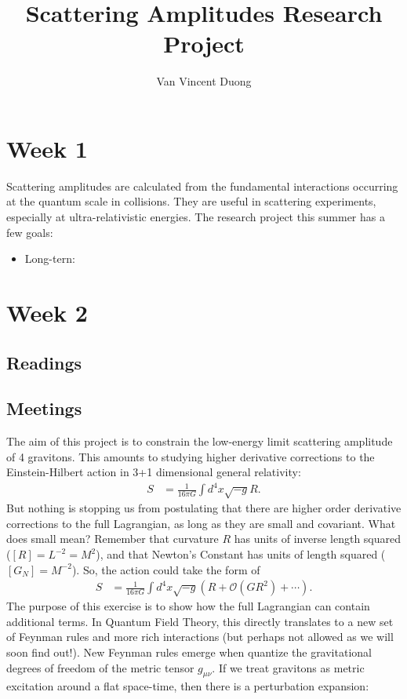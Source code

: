 \documentclass[11pt,a4paper]{article}
\author{Van Vincent Duong}
\title{Scattering Amplitudes Research Project}
\begin{document}
\maketitle

\section*{Week 1}

Scattering amplitudes are calculated from the fundamental interactions occurring at the quantum scale in collisions.  They are useful in scattering experiments, especially at ultra-relativistic energies.  The research project this summer has a few goals:
\begin{itemize}
	\item Long-tern: 
\end{itemize}

\section*{Week 2}
\subsection*{Readings}
\subsection*{Meetings}
The aim of this project is to constrain the low-energy limit scattering amplitude of 4 gravitons.  This amounts to studying higher derivative corrections to the Einstein-Hilbert action in 3+1 dimensional general relativity:
\begin{align*}
S & = \frac{1}{16\pi G}\int d^4x \sqrt{-g}R.
\end{align*}
But nothing is stopping us from postulating that there are higher order derivative corrections to the full Lagrangian, as long as they are small and covariant.  What does small mean?  Remember that curvature $R$ has units of inverse length squared ($[R] = L^{-2} = M^{2}$), and that Newton's Constant has units of length squared ($[G_N] = M^{-2}$).  So, the action could take the form of
\begin{align*}
S & = \frac{1}{16\pi G}\int d^4x \sqrt{-g}(R + \mathcal{O}(G R^2) + \cdots ).
\end{align*}
The purpose of this exercise is to show how the full Lagrangian can contain additional terms.  In Quantum Field Theory, this directly translates to a new set of Feynman rules and more rich interactions (but perhaps not allowed as we will soon find out!).  New Feynman rules emerge when quantize the gravitational degrees of freedom of the metric tensor $g_{\mu \nu}$.  If we treat gravitons as metric excitation around a flat space-time, then there is a perturbation expansion:
\end{document}
